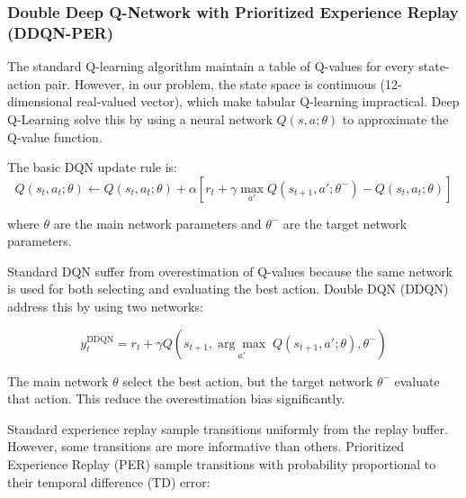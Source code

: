\documentclass[12pt,a4paper]{article}
\begin{document}
\subsubsection{Double Deep Q-Network with Prioritized Experience Replay (DDQN-PER)}
\label{sec:ddqn}


The standard Q-learning algorithm maintain a table of Q-values for every state-action pair. However, in our problem, the state space is continuous (12-dimensional real-valued vector), which make tabular Q-learning impractical. Deep Q-Learning solve this by using a neural network $Q(s, a; \theta)$ to approximate the Q-value function.

The basic DQN update rule is:
\begin{equation}
    Q(s_t, a_t; \theta) \gets Q(s_t, a_t; \theta) + \alpha \left[ r_t + \gamma \max_{a'} Q(s_{t+1}, a'; \theta^{-}) - Q(s_t, a_t; \theta) \right]
    \label{eq:dqn_update}
\end{equation}

where $\theta$ are the main network parameters and $\theta^{-}$ are the target network parameters.


Standard DQN suffer from overestimation of Q-values because the same network is used for both selecting and evaluating the best action. Double DQN (DDQN) address this by using two networks:

\begin{equation}
    y_t^{\text{DDQN}} = r_t + \gamma Q\left(s_{t+1}, \underset{a'}{\arg\max}\; Q(s_{t+1}, a'; \theta), \theta^{-}\right)
    \label{eq:ddqn_target}
\end{equation}

The main network $\theta$ select the best action, but the target network $\theta^{-}$ evaluate that action. This reduce the overestimation bias significantly.


Standard experience replay sample transitions uniformly from the replay buffer. However, some transitions are more informative than others. Prioritized Experience Replay (PER) sample transitions with probability proportional to their temporal difference (TD) error:
\end{document}
